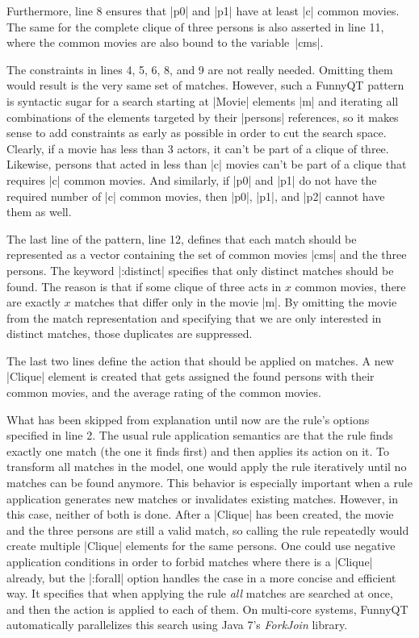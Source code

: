 \documentclass[submission]{eptcs}
\newcommand{\code}{\clojureinline}
\begin{document}
Furthermore, line 8 ensures that \code|p0| and \code|p1| have at least \code|c|
common movies.  The same for the complete clique of three persons is also
asserted in line 11, where the common movies are also bound to the
variable~\code|cms|.

The constraints in lines 4, 5, 6, 8, and 9 are not really needed.  Omitting
them would result is the very same set of matches.  However, such a FunnyQT
pattern is syntactic sugar for a search starting at \code|Movie| elements
\code|m| and iterating all combinations of the elements targeted by their
\code|persons| references, so it makes sense to add constraints as early as
possible in order to cut the search space.  Clearly, if a movie has less than 3
actors, it can't be part of a clique of three.  Likewise, persons that acted in
less than \code|c| movies can't be part of a clique that requires \code|c|
common movies.  And similarly, if \code|p0| and \code|p1| do not have the
required number of \code|c| common movies, then \code|p0|, \code|p1|, and
\code|p2| cannot have them as well.

The last line of the pattern, line 12, defines that each match should be
represented as a vector containing the set of common movies \code|cms| and the
three persons.  The keyword \code|:distinct| specifies that only distinct
matches should be found.  The reason is that if some clique of three acts in
\(x\)
common movies, there are exactly \(x\)
matches that differ only in the movie \code|m|.  By omitting the movie from the
match representation and specifying that we are only interested in distinct
matches, those duplicates are suppressed.

The last two lines define the action that should be applied on matches.  A new
\code|Clique| element is created that gets assigned the found persons with
their common movies, and the average rating of the common movies.

What has been skipped from explanation until now are the rule's options
specified in line 2.  The usual rule application semantics are that the rule
finds exactly one match (the one it finds first) and then applies its action on
it.  To transform all matches in the model, one would apply the rule
iteratively until no matches can be found anymore.  This behavior is especially
important when a rule application generates new matches or invalidates existing
matches.  However, in this case, neither of both is done.  After a
\code|Clique| has been created, the movie and the three persons are still a
valid match, so calling the rule repeatedly would create multiple \code|Clique|
elements for the same persons.  One could use negative application conditions
in order to forbid matches where there is a \code|Clique| already, but the
\code|:forall| option handles the case in a more concise and efficient way.  It
specifies that when applying the rule \emph{all} matches are searched at once,
and then the action is applied to each of them.  On multi-core systems, FunnyQT
automatically parallelizes this search using Java 7's \emph{ForkJoin} library.
\end{document}
